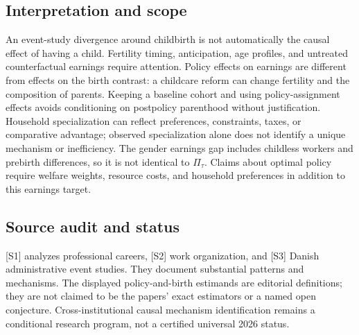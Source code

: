 \documentclass[11pt,a4paper]{article}
\begin{document}
\subsection*{Interpretation and scope}
An event-study divergence around childbirth is not automatically the causal effect of having a child. Fertility timing, anticipation, age profiles, and untreated counterfactual earnings require attention. Policy effects on earnings are different from effects on the birth contrast: a childcare reform can change fertility and the composition of parents. Keeping a baseline cohort and using policy-assignment effects avoids conditioning on postpolicy parenthood without justification. Household specialization can reflect preferences, constraints, taxes, or comparative advantage; observed specialization alone does not identify a unique mechanism or inefficiency. The gender earnings gap includes childless workers and prebirth differences, so it is not identical to $\Pi_\tau$. Claims about optimal policy require welfare weights, resource costs, and household preferences in addition to this earnings target.
\subsection*{Source audit and status}
[S1] analyzes professional careers, [S2] work organization, and [S3] Danish administrative event studies. They document substantial patterns and mechanisms. The displayed policy-and-birth estimands are editorial definitions; they are not claimed to be the papers' exact estimators or a named open conjecture. Cross-institutional causal mechanism identification remains a conditional research program, not a certified universal 2026 status.
\end{document}
